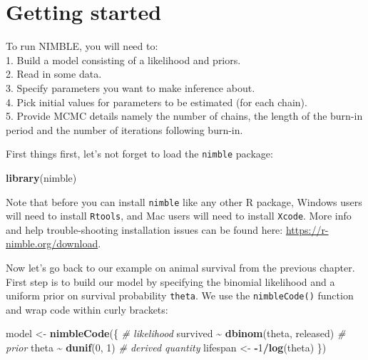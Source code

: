 \documentclass[
  12pt,
]{krantz}
\newenvironment{Shaded}{\begin{snugshade}}{\end{snugshade}}
\newcommand{\CommentTok}[1]{\textcolor[rgb]{0.56,0.35,0.01}{\textit{#1}}}
\newcommand{\DecValTok}[1]{\textcolor[rgb]{0.00,0.00,0.81}{#1}}
\newcommand{\FunctionTok}[1]{\textcolor[rgb]{0.13,0.29,0.53}{\textbf{#1}}}
\newcommand{\NormalTok}[1]{#1}
\newcommand{\OtherTok}[1]{\textcolor[rgb]{0.56,0.35,0.01}{#1}}
\newcommand{\SpecialCharTok}[1]{\textcolor[rgb]{0.81,0.36,0.00}{\textbf{#1}}}
\begin{document}
\section{Getting started}\label{start-nimble}

\begin{blackbox}
To run NIMBLE, you will need to:\\
1. Build a model consisting of a likelihood and priors.\\
2. Read in some data.\\
3. Specify parameters you want to make inference about.\\
4. Pick initial values for parameters to be estimated (for each chain).\\
5. Provide MCMC details namely the number of chains, the length of the burn-in period and the number of iterations following burn-in.

\end{blackbox}

First things first, let's not forget to load the \texttt{nimble} package:

\begin{Shaded}
\begin{Highlighting}[]
\FunctionTok{library}\NormalTok{(nimble)}
\end{Highlighting}
\end{Shaded}

Note that before you can install \texttt{nimble} like any other R package, Windows users will need to install \texttt{Rtools}, and Mac users will need to install \texttt{Xcode}. More info and help trouble-shooting installation issues can be found here: \url{https://r-nimble.org/download}.

Now let's go back to our example on animal survival from the previous chapter. First step is to build our model by specifying the binomial likelihood and a uniform prior on survival probability \texttt{theta}. We use the \texttt{nimbleCode()} function and wrap code within curly brackets:

\begin{Shaded}
\begin{Highlighting}[]
\NormalTok{model }\OtherTok{\textless{}{-}} \FunctionTok{nimbleCode}\NormalTok{(\{}
  \CommentTok{\# likelihood}
\NormalTok{  survived }\SpecialCharTok{\textasciitilde{}} \FunctionTok{dbinom}\NormalTok{(theta, released)}
  \CommentTok{\# prior}
\NormalTok{  theta }\SpecialCharTok{\textasciitilde{}} \FunctionTok{dunif}\NormalTok{(}\DecValTok{0}\NormalTok{, }\DecValTok{1}\NormalTok{)}
  \CommentTok{\# derived quantity}
\NormalTok{  lifespan }\OtherTok{\textless{}{-}} \SpecialCharTok{{-}}\DecValTok{1}\SpecialCharTok{/}\FunctionTok{log}\NormalTok{(theta)}
\NormalTok{\})}
\end{Highlighting}
\end{Shaded}
\end{document}
